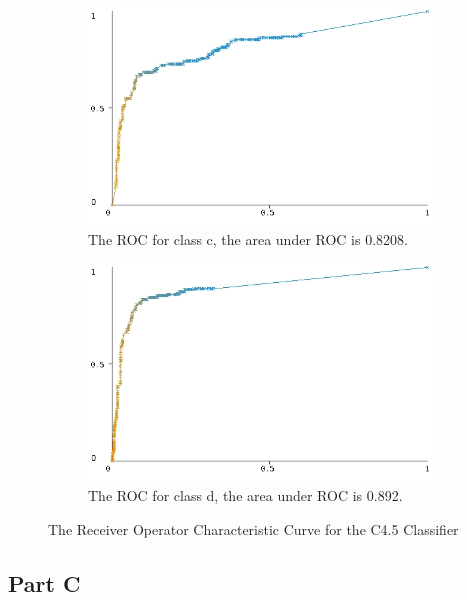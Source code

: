 \documentclass[10pt]{article}
\begin{document}
\begin{figure}[h]
\begin{subfigure}[b]{0.475\textwidth}
        \includegraphics[width=\textwidth]{c45_roc/roc_curve_c.jpg}
        \caption[]%
        {{\small The ROC for class c, the area under ROC is 0.8208.}}    
        \label{fig:c45 roc curve class c}
    \end{subfigure}
    \quad
    \begin{subfigure}[b]{0.475\textwidth}   
        \centering 
        \includegraphics[width=\textwidth]{c45_roc/roc_curve_e(d).jpg}
        \caption[]%
        {{\small The ROC for class d, the area under ROC is 0.892.}}    
        \label{fig:c45 roc curve class d}
    \end{subfigure}
    \caption[ ]
    {\small The Receiver Operator Characteristic Curve for the C4.5 Classifier} 
    \label{fig:c45 roc curves}
\end{figure}



\subsection*{Part C}
\end{document}
